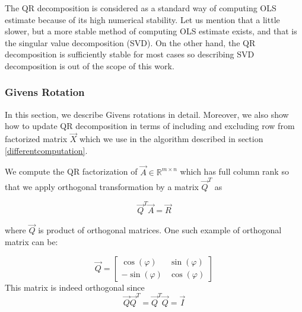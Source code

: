 The QR decomposition is considered as a standard way of computing OLS estimate because of its high numerical stability. Let us mention that a little slower, but a more stable method of computing OLS estimate exists, and that is the singular value decomposition (SVD). On the other hand, the QR decomposition is sufficiently stable for most cases so describing SVD decomposition is out of the scope of this work. 



\subsubsection*{Givens Rotation} \label{givensrotation}
In this section, we describe Givens rotations in detail. Moreover, we also show how to update QR decomposition in terms of including and excluding row from factorized matrix $\vec{X}$ which we use in the algorithm described in section \ref{differentcomputation}.

We compute the QR factorization of $\vec{A} \in \mathbb{R}^{m \times n}$ which has full column rank so that we apply orthogonal transformation by a matrix $\vec{Q}^T$ as \cite{hammarling2008updatingqr}

\begin{equation}
    \vec{Q}^T\vec{A} = \vec{R}
\end{equation}
 
where $\vec{Q}$ is product of orthogonal matrices. One such example of orthogonal matrix can be:

\begin{equation} \label{givensmatrix}
\vec{Q} = 
\begin{bmatrix} 
\cos(\varphi) & \sin(\varphi) \\
- \sin(\varphi) & \cos(\varphi)
\end{bmatrix}
\end{equation}
This matrix is indeed orthogonal since 
\begin{equation} 
\vec{Q}\vec{Q}^T = \vec{Q}^T\vec{Q} = \vec{I}
\end{equation}
 

